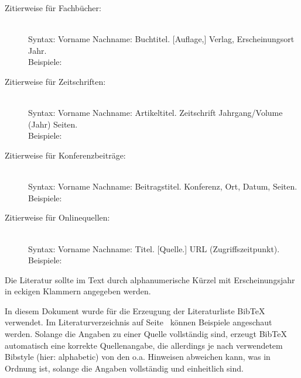 \documentclass[
    fontsize=12pt,
    headings=small,
    parskip=half,           %
    bibliography=totoc,
    numbers=noenddot,       %
    open=any,               %
    ]{scrreprt}
\begin{document}
\begin{description}

	\item[Zitierweise für Fachbücher:] \mbox{}\\[1ex]
	Syntax: Vorname Nachname: Buchtitel. {[}Auflage,{]} Verlag, Erscheinungsort Jahr. \\[1ex]
	Beispiele: \cite{Beut2009,ScWe2007}
	
	\item[Zitierweise für Zeitschriften:] \mbox{}\\[1ex]
	Syntax: Vorname Nachname: Artikeltitel. Zeitschrift Jahrgang/Volume (Jahr) Seiten. \\[1ex]
	Beispiele: \cite{Kili2006,Lamp1981,ThKZ2002} 

	\item[Zitierweise für Konferenzbeiträge:] \mbox{}\\[1ex]
	Syntax: Vorname Nachname: Beitragstitel. Konferenz, Ort, Datum, Seiten. \\[1ex]
	Beispiele: \cite{InBr2009,WWPK2010,HSFN2009}

	\item[Zitierweise für Onlinequellen:] \mbox{}\\[1ex]
	Syntax: Vorname Nachname: Titel. {[}Quelle.{]} URL (Zugriffszeitpunkt). \\[1ex]
	Beispiele: \cite{CCC2009,Heise2011,textwahrnehmung} 

\end{description}

Die Literatur sollte im Text durch alphanumerische Kürzel mit Erscheinungsjahr in eckigen Klammern angegeben werden. 
%

In diesem Dokument wurde für die Erzeugung der Literaturliste BibTeX verwendet. Im Literaturverzeichnis auf Seite~\pageref{sec:literaturverzeichnis} können Beispiele angeschaut werden. Solange die Angaben zu einer Quelle vollständig sind, erzeugt BibTeX automatisch eine korrekte Quellenangabe, die allerdings je nach verwendetem Bibstyle (hier: alphabetic) von den o.a. Hinweisen abweichen kann, was in Ordnung ist, solange die Angaben vollständig und einheitlich sind.
\end{document}
